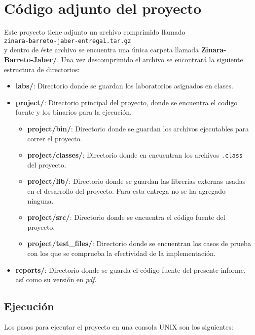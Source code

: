 \documentclass[12pt, spanish]{report}
\begin{document}
\section{C\'odigo adjunto del proyecto}
\label{sec:correr}

Este proyecto tiene adjunto un archivo comprimido llamado\\

\texttt{zinara-barreto-jaber-entrega1.tar.gz}\\

y dentro de \'este archivo se encuentra una \'unica carpeta llamada
\textbf{Zinara-Barreto-Jaber/}. Una vez descomprimido el archivo se
encontrar\'a la siguiente estructura de directorios:

\begin{itemize}
 \item \textbf{labs/}: Directorio donde se guardan los laboratorios
       asignados en clases.
 \item \textbf{project/}: Directorio principal del proyecto, donde se
       encuentra el codigo fuente y los binarios para la ejecuci\'on.
 \begin{itemize}
  \item \textbf{project/bin/}: Directorio donde se guardan los
	archivos ejecutables para correr el proyecto.
  \item \textbf{project/classes/}: Directorio donde en encuentran los
	archivos \texttt{.class} del proyecto.
  \item \textbf{project/lib/}: Directorio donde se guardan las
	librerias externas usadas en el desarrollo del proyecto. Para esta
	entrega no se ha agregado ninguna.
  \item \textbf{project/src/}: Directorio donde se encuentra el c\'odigo
	fuente del proyecto.
  \item \textbf{project/test\_files/}: Directorio donde se encuentran los
	casos de prueba con los que se comprueba la efectividad de la implementaci\'on.
 \end{itemize}
 \item \textbf{reports/}: Directorio donde se guarda el c\'odigo fuente
       del presente informe, as\'i como su versi\'on en \emph{pdf}.
\end{itemize}

\subsection{Ejecuci\'on}
\label{sec:zejecucion}
Los pasos para ejecutar el proyecto en una consola UNIX son los
siguientes:
  
\end{document}
